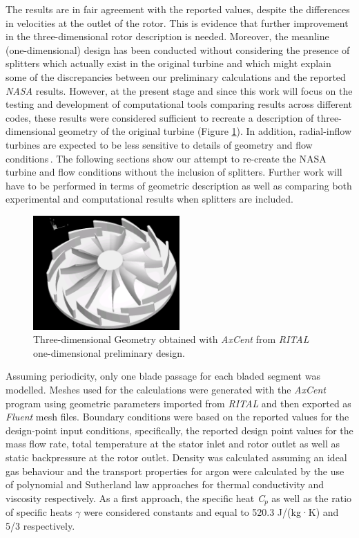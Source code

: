 \documentclass[12pt,a4paper,twoside]{article}
\begin{document}
The results are in fair agreement with the reported values, despite the differences in velocities
at the outlet of the rotor.
This is evidence that further improvement in the three-dimensional rotor description is needed.
Moreover, the meanline (one-dimensional) design has been conducted without considering 
the presence of splitters which actually exist in the original turbine and which might explain some 
of the discrepancies between our preliminary calculations and the reported \textit{NASA} results.
However, at the present stage and since this work will focus on the testing and development of computational tools 
comparing results across different codes,
these results were considered sufficient to recreate a description of three-dimensional geometry 
of the original turbine (Figure \ref{fig_3D_geometry}). 
In addition, radial-inflow turbines are expected to be less sensitive to details of geometry and flow conditions\,\cite{Rohlik_1972}.
The following sections show our attempt to re-create the NASA turbine and flow conditions without
the inclusion of splitters.
Further work will have to be performed in terms of geometric description 
as well as comparing both experimental and computational results when splitters are included.


\begin{figure}[htbp]
  \centering
  \includegraphics[width=0.5\textwidth]{./figures/3D_Geometry_NasaTurbine_fromAxcent_1.png}
  \caption{Three-dimensional Geometry obtained with \textit{AxCent} from \textit{RITAL} one-dimensional preliminary design.}
  \label{fig_3D_geometry}
\end{figure}

Assuming periodicity, only one blade passage for each bladed segment was modelled. 
Meshes used for the calculations were generated with the \textit{AxCent} program using geometric parameters
imported from \textit{RITAL} and then exported as \textit{Fluent} mesh files.
Boundary conditions were based on the reported values for the design-point input conditions, 
specifically, the reported design point values for the mass flow rate, 
total temperature at the stator inlet and rotor outlet as well as static backpressure at the rotor outlet.
Density was calculated assuming an ideal gas behaviour and the transport properties for argon were calculated by the use of polynomial and Sutherland law approaches for thermal conductivity and viscosity respectively. 
As a first approach, the specific heat \textit{C$_p$} as well as the ratio of specific heats \textit{$\gamma$} were considered constants and equal to 520.3 J/(kg·K) and 5/3 respectively.
\end{document}

